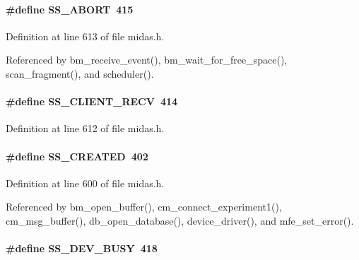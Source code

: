 \paragraph[{SS\_\-ABORT}]{\setlength{\rightskip}{0pt plus 5cm}\#define SS\_\-ABORT~415}\hfill\label{group__err24_ga136923b4499af07f13a3cd631b88ec0e}

\begin{DoxyItemize}
\item 
\end{DoxyItemize}

Definition at line 613 of file midas.h.

Referenced by bm\_\-receive\_\-event(), bm\_\-wait\_\-for\_\-free\_\-space(), scan\_\-fragment(), and scheduler().
\paragraph[{SS\_\-CLIENT\_\-RECV}]{\setlength{\rightskip}{0pt plus 5cm}\#define SS\_\-CLIENT\_\-RECV~414}\hfill\label{group__err24_gafe9fb1a199a6e53c4478a0fe83931986}

\begin{DoxyItemize}
\item 
\end{DoxyItemize}

Definition at line 612 of file midas.h.
\paragraph[{SS\_\-CREATED}]{\setlength{\rightskip}{0pt plus 5cm}\#define SS\_\-CREATED~402}\hfill\label{group__err24_ga7440cf35b00082fb16e8584ada5b50e0}

\begin{DoxyItemize}
\item 
\end{DoxyItemize}

Definition at line 600 of file midas.h.

Referenced by bm\_\-open\_\-buffer(), cm\_\-connect\_\-experiment1(), cm\_\-msg\_\-buffer(), db\_\-open\_\-database(), device\_\-driver(), and mfe\_\-set\_\-error().
\paragraph[{SS\_\-DEV\_\-BUSY}]{\setlength{\rightskip}{0pt plus 5cm}\#define SS\_\-DEV\_\-BUSY~418}\hfill\label{group__err24_gab33c355e9ba39a4bc024efc9c3bfdbbe}

